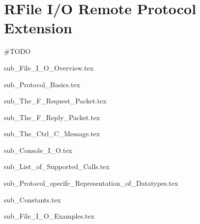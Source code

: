 \section{RFile I/O Remote Protocol Extension}

\#TODO

{sub_File_I_O_Overview.tex }

{sub_Protocol_Basics.tex }

{sub_The_F_Request_Packet.tex }

{sub_The_F_Reply_Packet.tex }

{sub_The_Ctrl_C_Message.tex }

{sub_Console_I_O.tex }

{sub_List_of_Supported_Calls.tex }

{sub_Protocol_specifc_Representation_of_Datatypes.tex }

{sub_Constants.tex }

{sub_File_I_O_Examples.tex }
